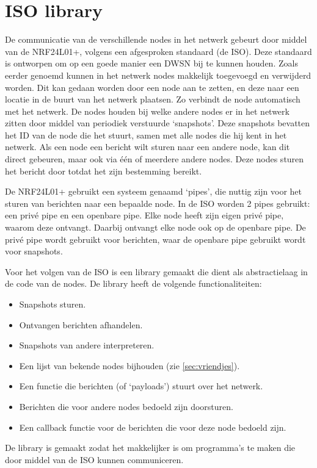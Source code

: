 \section{ISO library}

De communicatie van de verschillende nodes in het netwerk gebeurt door middel van de NRF24L01+, volgens een afgesproken standaard (de ISO). Deze standaard is ontworpen om op een goede manier een DWSN bij te kunnen houden. Zoals eerder genoemd kunnen in het netwerk nodes makkelijk toegevoegd en verwijderd worden. Dit kan gedaan worden door een node aan te zetten, en deze naar een locatie in de buurt van het netwerk plaatsen. Zo verbindt de node automatisch met het netwerk. De nodes houden bij welke andere nodes er in het netwerk zitten door middel van periodiek verstuurde `snapshots'. Deze snapshots bevatten het ID van de node die het stuurt, samen met alle nodes die hij kent in het netwerk. Als een node een bericht wilt sturen naar een andere node, kan dit direct gebeuren, maar ook via één of meerdere andere nodes. Deze nodes sturen het bericht door totdat het zijn bestemming bereikt.

De NRF24L01+ gebruikt een systeem genaamd `pipes', die nuttig zijn voor het sturen van berichten naar een bepaalde node. In de ISO worden 2 pipes gebruikt: een privé pipe en een openbare pipe. Elke node heeft zijn eigen privé pipe, waarom deze ontvangt. Daarbij ontvangt elke node ook op de openbare pipe. De privé pipe wordt gebruikt voor berichten, waar de openbare pipe gebruikt wordt voor snapshots.

Voor het volgen van de ISO is een library gemaakt die dient als abstractielaag in de code van de nodes. De library heeft de volgende functionaliteiten:
\begin{itemize}
    \item Snapshots sturen.
    \item Ontvangen berichten afhandelen.
    \item Snapshots van andere interpreteren.
    \item Een lijst van bekende nodes bijhouden (zie \autoref{sec:vriendjes}).
    \item Een functie die berichten (of `payloads') stuurt over het netwerk.
    \item Berichten die voor andere nodes bedoeld zijn doorsturen.
    \item Een callback functie voor de berichten die voor deze node bedoeld zijn.
\end{itemize}
De library is gemaakt zodat het makkelijker is om programma's te maken die door middel van de ISO kunnen communiceren.


